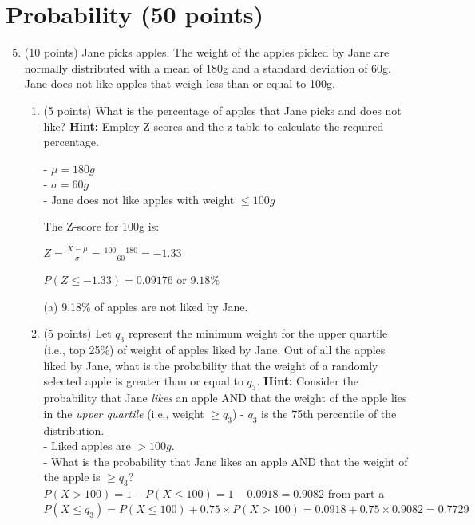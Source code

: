 \documentclass{article}%
\begin{document}
\section*{Probability (50 points)}
\begin{enumerate}
    \setcounter{enumi}{4}
    \item (10 points) Jane picks apples. The weight of the apples picked by Jane are normally distributed with a mean of 180g and a standard deviation of 60g. Jane does not like apples that weigh less than or equal to 100g. 
    \begin{enumerate}
        \item (5 points) What is the percentage of apples that Jane picks and does not like? \textbf{Hint:} Employ Z-scores and the z-table to calculate the required percentage.

            - $\mu = 180g$\\
            - $\sigma = 60g$\\
            - Jane does not like apples with weight $\leq 100g$

            The Z-score for 100g is:

            $Z = \frac{X - \mu}{\sigma} = \frac{100 - 180}{60} = -1.33$

            $P(Z\leq -1.33) = 0.09176$ or $9.18\%$
    
            (a) 9.18\% of apples are not liked by Jane.

        \item (5 points) Let $q_3$ represent the minimum weight for the upper quartile (i.e., top 25\%) of weight of apples  liked by Jane. Out of all the apples liked by Jane, what is the probability that the weight of a randomly selected apple is greater than or equal to $q_3$. \textbf{Hint:} Consider the probability that Jane \emph{likes} an apple AND that the weight of the apple lies in the \emph{upper quartile} (i.e., weight $\geq q_3$)
            - $q_3$ is the 75th percentile of the distribution.\\
            - Liked apples are $> 100g$.\\
            - What is the probability that Jane likes an apple AND that the weight of the apple is $\geq q_3$?\\

            $P(X>100) = 1 - P(X \leq 100) = 1 - 0.0918 = 0.9082$ from part a\\
            $P(X \leq q_3) = P(X \leq 100) + 0.75 \times P(X > 100) = 0.0918 + 0.75 \times 0.9082 = 0.7729$\\


\end{enumerate}
\end{enumerate}
\end{document}
